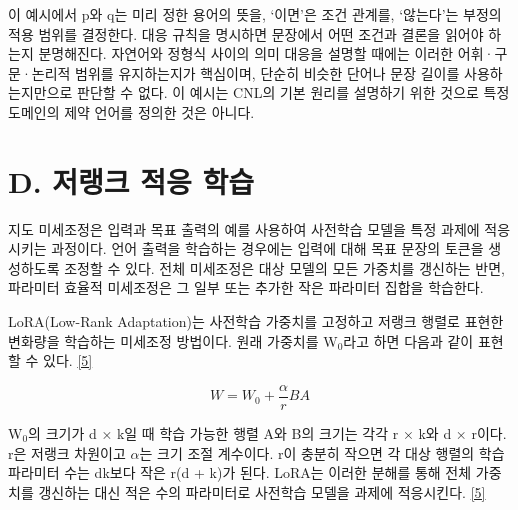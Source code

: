 \documentclass[11pt,a4paper]{article}
\begin{document}
이 예시에서 p와 q는 미리 정한 용어의 뜻을, ‘이면’은 조건 관계를, ‘않는다’는 부정의 적용 범위를 결정한다. 대응 규칙을 명시하면 문장에서 어떤 조건과 결론을 읽어야 하는지 분명해진다. 자연어와 정형식 사이의 의미 대응을 설명할 때에는 이러한 어휘·구문·논리적 범위를 유지하는지가 핵심이며, 단순히 비슷한 단어나 문장 길이를 사용하는지만으로 판단할 수 없다. 이 예시는 CNL의 기본 원리를 설명하기 위한 것으로 특정 도메인의 제약 언어를 정의한 것은 아니다.\par

\section*{D. 저랭크 적응 학습}

지도 미세조정은 입력과 목표 출력의 예를 사용하여 사전학습 모델을 특정 과제에 적응시키는 과정이다. 언어 출력을 학습하는 경우에는 입력에 대해 목표 문장의 토큰을 생성하도록 조정할 수 있다. 전체 미세조정은 대상 모델의 모든 가중치를 갱신하는 반면, 파라미터 효율적 미세조정은 그 일부 또는 추가한 작은 파라미터 집합을 학습한다.\par

LoRA(Low-Rank Adaptation)는 사전학습 가중치를 고정하고 저랭크 행렬로 표현한 변화량을 학습하는 미세조정 방법이다. 원래 가중치를 W\ensuremath{{}_0}라고 하면 다음과 같이 표현할 수 있다. \href{\detokenize{https://arxiv.org/abs/2106.09685}}{[5]}\par

\[W = W_0 + \frac{\alpha}{r}BA\]

W\ensuremath{{}_0}의 크기가 d × k일 때 학습 가능한 행렬 A와 B의 크기는 각각 r × k와 d × r이다. r은 저랭크 차원이고 \ensuremath{\alpha}는 크기 조절 계수이다. r이 충분히 작으면 각 대상 행렬의 학습 파라미터 수는 dk보다 작은 r(d + k)가 된다. LoRA는 이러한 분해를 통해 전체 가중치를 갱신하는 대신 적은 수의 파라미터로 사전학습 모델을 과제에 적응시킨다. \href{\detokenize{https://arxiv.org/abs/2106.09685}}{[5]}\par
\end{document}
